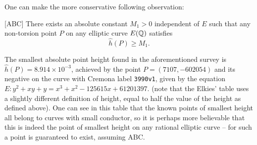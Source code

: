 One can make the more conservative following observation:
\begin{corollary}\label{conj:point_height_lower_bound}[ABC]
There exists an absolute constant $M_1 >0$ independent of $E$ such that any non-torsion point $P$ on any elliptic curve $E(\mathbb{Q})$ satisfies
\begin{equation}
\hat{h}(P) \ge M_1 .
\end{equation}
\end{corollary}
The smallest absolute point height found in the aforementioned survey is $\hat{h}(P) = 8.914\times 10^{-3}$, achieved by the point $P = (7107,-602054)$ and its negative on the curve with Cremona label {\tt 3990v1}, given by the equation $E: y^2+xy+y=x^3+x^2-125615x+61201397$. (note that the Elkies' table uses a slightly different definition of height, equal to half the value of the height as defined above). One can see in this table that the known points of smallest height all belong to curves with small conductor, so it is perhaps more believable that this is indeed the point of smallest height on any rational elliptic curve -- for such a point is guaranteed to exist, assuming ABC. \\

